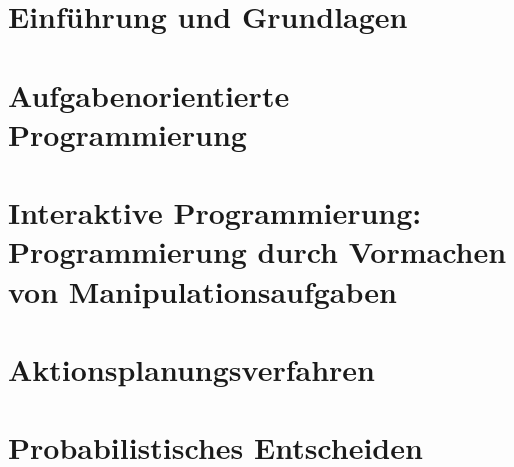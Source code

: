 \documentclass[11pt]{scrartcl}
\begin{document}
\section{Einführung und Grundlagen} %


\section{Aufgabenorientierte Programmierung} %


\section{Interaktive Programmierung: Programmierung durch Vormachen von Manipulationsaufgaben} %



\section{Aktionsplanungsverfahren} %
\section{Probabilistisches Entscheiden} %
\end{document}
